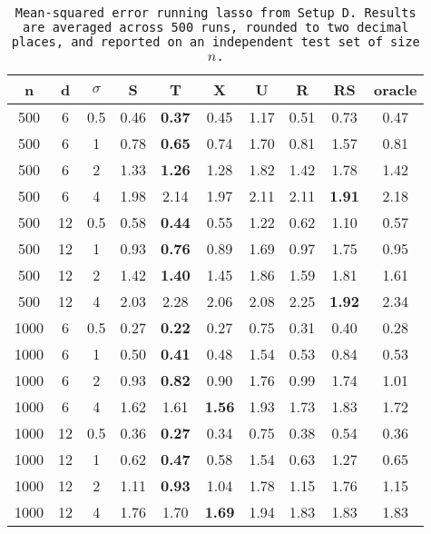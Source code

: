 \begin{table}[ht]
\centering
\begin{tabular}{cccccccccc}
  \hline
n & d & $\sigma$ & S & T & X & U & R & RS & oracle \\ 
  \hline
500 & 6 & 0.5 & 0.46 & \bf 0.37 & 0.45 & 1.17 & 0.51 & 0.73 & 0.47 \\ 
  500 & 6 & 1 & 0.78 & \bf 0.65 & 0.74 & 1.70 & 0.81 & 1.57 & 0.81 \\ 
  500 & 6 & 2 & 1.33 & \bf 1.26 & 1.28 & 1.82 & 1.42 & 1.78 & 1.42 \\ 
  500 & 6 & 4 & 1.98 & 2.14 & 1.97 & 2.11 & 2.11 & \bf 1.91 & 2.18 \\ 
  500 & 12 & 0.5 & 0.58 & \bf 0.44 & 0.55 & 1.22 & 0.62 & 1.10 & 0.57 \\ 
  500 & 12 & 1 & 0.93 & \bf 0.76 & 0.89 & 1.69 & 0.97 & 1.75 & 0.95 \\ 
  500 & 12 & 2 & 1.42 & \bf 1.40 & 1.45 & 1.86 & 1.59 & 1.81 & 1.61 \\ 
  500 & 12 & 4 & 2.03 & 2.28 & 2.06 & 2.08 & 2.25 & \bf 1.92 & 2.34 \\ 
  1000 & 6 & 0.5 & 0.27 & \bf 0.22 & 0.27 & 0.75 & 0.31 & 0.40 & 0.28 \\ 
  1000 & 6 & 1 & 0.50 & \bf 0.41 & 0.48 & 1.54 & 0.53 & 0.84 & 0.53 \\ 
  1000 & 6 & 2 & 0.93 & \bf 0.82 & 0.90 & 1.76 & 0.99 & 1.74 & 1.01 \\ 
  1000 & 6 & 4 & 1.62 & 1.61 & \bf 1.56 & 1.93 & 1.73 & 1.83 & 1.72 \\ 
  1000 & 12 & 0.5 & 0.36 & \bf 0.27 & 0.34 & 0.75 & 0.38 & 0.54 & 0.36 \\ 
  1000 & 12 & 1 & 0.62 & \bf 0.47 & 0.58 & 1.54 & 0.63 & 1.27 & 0.65 \\ 
  1000 & 12 & 2 & 1.11 & \bf 0.93 & 1.04 & 1.78 & 1.15 & 1.76 & 1.15 \\ 
  1000 & 12 & 4 & 1.76 & 1.70 & \bf 1.69 & 1.94 & 1.83 & 1.83 & 1.83 \\ 
   \hline
\end{tabular}
\caption{\tt Mean-squared error running \texttt{lasso} from Setup D. Results are averaged across 500 runs, rounded to two decimal places, and reported on an independent test set of size $n$.} 
\label{table:setup4}
\end{table}

